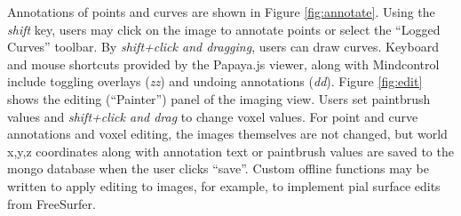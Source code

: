 Annotations of points and curves are shown in Figure \ref{fig:annotate}. Using the \textit{shift} key, users may click on the image to annotate points or select the ``Logged Curves'' toolbar. By \textit{shift+click and dragging}, users can draw curves. Keyboard and mouse shortcuts provided by the Papaya.js viewer, along with Mindcontrol include toggling overlays (\textit{zz}) and undoing annotations (\textit{dd}). Figure \ref{fig:edit} shows the editing (``Painter'') panel of the imaging view. Users set paintbrush values and \textit{shift+click and drag} to change voxel values. For point and curve annotations and voxel editing, the images themselves are not changed, but world x,y,z coordinates along with annotation text or paintbrush values are saved to the mongo database when the user clicks ``save''. Custom offline functions may be written to apply editing to images, for example, to implement pial surface edits from FreeSurfer. 